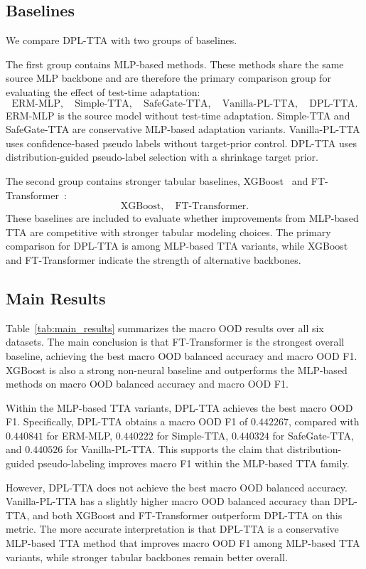\documentclass{article}
\begin{document}
\subsection{Baselines}

We compare DPL-TTA with two groups of baselines.

The first group contains MLP-based methods. These methods share the same source MLP backbone and are therefore the primary comparison group for evaluating the effect of test-time adaptation:
\[
\text{ERM-MLP}, \quad
\text{Simple-TTA}, \quad
\text{SafeGate-TTA}, \quad
\text{Vanilla-PL-TTA}, \quad
\text{DPL-TTA}.
\]
ERM-MLP is the source model without test-time adaptation. Simple-TTA and SafeGate-TTA are conservative MLP-based adaptation variants. Vanilla-PL-TTA uses confidence-based pseudo labels without target-prior control. DPL-TTA uses distribution-guided pseudo-label selection with a shrinkage target prior.

The second group contains stronger tabular baselines, XGBoost~\citep{chen2016xgboost} and FT-Transformer~\citep{gorishniy2021revisiting}:
\[
\text{XGBoost}, \quad \text{FT-Transformer}.
\]
These baselines are included to evaluate whether improvements from MLP-based TTA are competitive with stronger tabular modeling choices. The primary comparison for DPL-TTA is among MLP-based TTA variants, while XGBoost and FT-Transformer indicate the strength of alternative backbones.

\subsection{Main Results}

Table~\ref{tab:main_results} summarizes the macro OOD results over all six datasets. The main conclusion is that FT-Transformer is the strongest overall baseline, achieving the best macro OOD balanced accuracy and macro OOD F1. XGBoost is also a strong non-neural baseline and outperforms the MLP-based methods on macro OOD balanced accuracy and macro OOD F1.

Within the MLP-based TTA variants, DPL-TTA achieves the best macro OOD F1. Specifically, DPL-TTA obtains a macro OOD F1 of $0.442267$, compared with $0.440841$ for ERM-MLP, $0.440222$ for Simple-TTA, $0.440324$ for SafeGate-TTA, and $0.440526$ for Vanilla-PL-TTA. This supports the claim that distribution-guided pseudo-labeling improves macro F1 within the MLP-based TTA family.

However, DPL-TTA does not achieve the best macro OOD balanced accuracy. Vanilla-PL-TTA has a slightly higher macro OOD balanced accuracy than DPL-TTA, and both XGBoost and FT-Transformer outperform DPL-TTA on this metric. The more accurate interpretation is that DPL-TTA is a conservative MLP-based TTA method that improves macro OOD F1 among MLP-based TTA variants, while stronger tabular backbones remain better overall.
\end{document}
